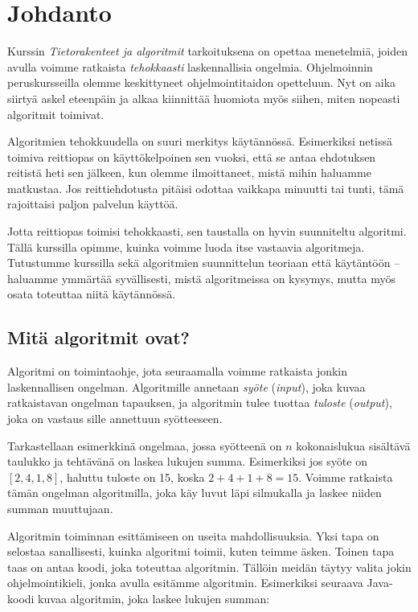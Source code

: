 \chapter{Johdanto}

Kurssin \emph{Tietorakenteet ja algoritmit} tarkoituksena
on opettaa menetelmiä, joiden avulla voimme ratkaista
\emph{tehokkaasti} laskennallisia ongelmia.
Ohjelmoinnin peruskursseilla olemme keskittyneet
ohjelmointitaidon opetteluun.
Nyt on aika siirtyä askel eteenpäin ja alkaa kiinnittää
huomiota myös siihen, miten nopeasti algoritmit toimivat.

Algoritmien tehokkuudella on suuri merkitys käytännössä.
Esimerkiksi netissä toimiva reittiopas on käyttökelpoinen sen vuoksi,
että se antaa ehdotuksen reitistä heti sen jälkeen, kun olemme
ilmoittaneet, mistä mihin haluamme matkustaa.
Jos reittiehdotusta pitäisi odottaa vaikkapa minuutti tai tunti,
tämä rajoittaisi paljon palvelun käyttöä.

Jotta reittiopas toimisi tehokkaasti, sen taustalla on
hyvin suunniteltu algoritmi.
Tällä kurssilla opimme, kuinka voimme luoda itse vastaavia algoritmeja.
Tutustumme kurssilla sekä algoritmien suunnittelun teoriaan että
käytäntöön -- haluamme ymmärtää syvällisesti, mistä algoritmeissa on kysymys,
mutta myös osata toteuttaa niitä käytännössä.

\section{Mitä algoritmit ovat?}


Algoritmi on toimintaohje, jota seuraamalla voimme ratkaista
jonkin laskennallisen ongelman.
Algoritmille annetaan \emph{syöte} (\emph{input}),
joka kuvaa ratkaistavan ongelman tapauksen,
ja algoritmin tulee tuottaa \emph{tuloste} (\emph{output}),
joka on vastaus sille annettuun syötteeseen.

Tarkastellaan esimerkkinä ongelmaa,
jossa syötteenä on $n$ kokonaislukua sisältävä taulukko ja
tehtävänä on laskea lukujen summa.
Esimerkiksi jos syöte on $[2,4,1,8]$,
haluttu tuloste on 15, koska $2+4+1+8=15$.
Voimme ratkaista tämän ongelman algoritmilla,
joka käy luvut läpi silmukalla ja laskee niiden
summan muuttujaan.

Algoritmin toiminnan esittämiseen on useita mahdollisuuksia.
Yksi tapa on selostaa sanallisesti, kuinka algoritmi toimii,
kuten teimme äsken.
Toinen tapa taas on antaa koodi, joka toteuttaa algoritmin.
Tällöin meidän täytyy valita jokin ohjelmointikieli,
jonka avulla esitämme algoritmin.
Esimerkiksi seuraava Java-koodi kuvaa algoritmin,
joka laskee lukujen summan:

